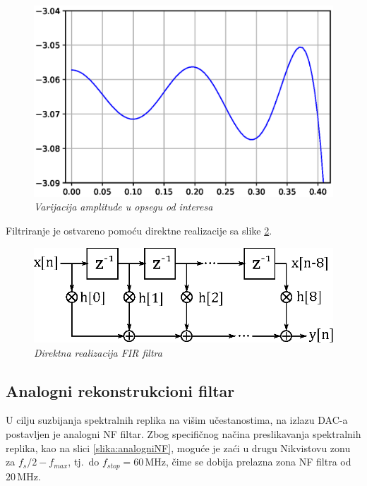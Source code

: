 \documentclass[conference]{IEEEtran}
\begin{document}
\begin{figure}[h]
	\centering
	\includegraphics[scale=0.5]{./slike/maxVar.eps}
	\caption{\textsl{Varijacija amplitude u opsegu od interesa}}
	\label{slika:maxVar}
\end{figure}

Filtriranje je ostvareno pomoću direktne realizacije sa slike \ref{slika:FIRreal}.

\begin{figure}[h]
	\centering
	\includegraphics[scale=0.7]{./slike/FIRreal.eps}
	\caption{\textsl{Direktna realizacija FIR filtra}}
	\label{slika:FIRreal}
\end{figure}

\subsection{Analogni rekonstrukcioni filtar}
U cilju suzbijanja spektralnih replika na višim učestanostima, na izlazu DAC-a postavljen je analogni NF filtar. Zbog specifičnog načina preslikavanja spektralnih replika, kao na slici \ref{slika:analogniNF}, moguće je zaći u drugu Nikvistovu zonu za $f_s/2-f_{max}$, tj.~do $f_{stop}=60$\,MHz, čime se dobija prelazna zona NF filtra od $20$\,MHz.
\end{document}
